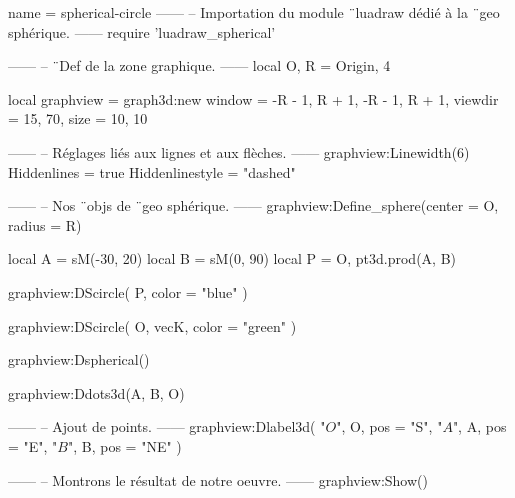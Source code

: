 \documentclass{standalone}
\begin{document}
\begin{luadraw}{name = spherical-circle}
------
-- Importation du module ¨luadraw dédié à la ¨geo sphérique.
------
require 'luadraw_spherical'

------
-- ¨Def de la zone graphique.
------
local O, R = Origin, 4

local graphview = graph3d:new{
  window  = {-R - 1, R + 1, -R - 1, R + 1},
  viewdir = {15, 70},
  size    = {10, 10}
}

------
-- Réglages liés aux lignes et aux flèches.
------
graphview:Linewidth(6)
Hiddenlines     = true
Hiddenlinestyle = "dashed"

------
-- Nos ¨objs de ¨geo sphérique.
------
graphview:Define_sphere({center = O, radius = R})

local A = sM(-30, 20)
local B = sM(0, 90)
local P = {O, pt3d.prod(A, B)}

graphview:DScircle(
  P,
  {color = "blue"}
)

graphview:DScircle(
  {O, vecK},
  {color = "green"}
)

graphview:Dspherical()

graphview:Ddots3d({A, B, O})

------
-- Ajout de points.
------
graphview:Dlabel3d(
  "$O$", O, {pos = "S"},
  "$A$", A, {pos = "E"},
  "$B$", B, {pos = "NE"}
)

------
-- Montrons le résultat de notre oeuvre.
------
graphview:Show()
\end{luadraw}
\end{document}
